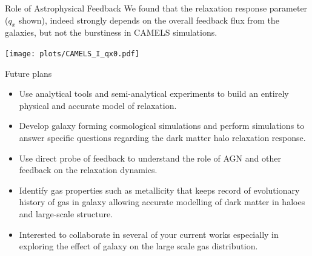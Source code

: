 \documentclass{beamer}
\begin{document}
\begin{frame}{Role of Astrophysical Feedback}
    We found that the relaxation response parameter ($q_x$ shown), indeed strongly depends on the overall feedback flux from the galaxies, but not the burstiness in CAMELS simulations.
    \begin{center}
        \texttt{[image: plots/CAMELS\_I\_qx0.pdf]}
    \end{center}
\end{frame}


\begin{frame}{Future plans}
    \begin{itemize}
        \item Use analytical tools and semi-analytical experiments to build an entirely physical and accurate model of relaxation.
        \item Develop galaxy forming cosmological simulations and perform simulations to answer specific questions regarding the dark matter halo relaxation response.
        \item Use direct probe of feedback to understand the role of AGN and other feedback on the relaxation dynamics.
        \item Identify gas properties such as metallicity that keeps record of evolutionary history of gas in galaxy allowing accurate modelling of dark matter in haloes and large-scale structure.
        \item Interested to collaborate in several of your current works especially in exploring the effect of galaxy on the large scale gas distribution.
    \end{itemize}
\end{frame}
\end{document}
